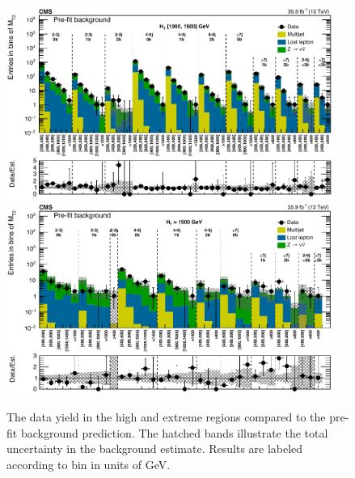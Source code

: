 \begin{figure}
	\centering
	\includegraphics[width=0.95\textwidth]{results/figs/mt2_highHT_fullEstimate}
	\includegraphics[width=0.95\textwidth]{results/figs/mt2_extremeHT_fullEstimate}
	\caption{The data yield in the high \HT and extreme \HT regions compared to the pre-fit background prediction. The hatched bands illustrate the total uncertainty in the background estimate. Results are labeled according to \mttwo bin in units of GeV.}
	\label{fig:yieldPrefit3}
\end{figure}

